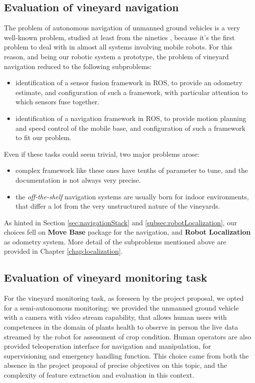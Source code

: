 \subsection{Evaluation of vineyard navigation}
The problem of autonomous navigation of unmanned ground vehicles is a very well-known problem, studied at least from the nineties \parencite{storiaUGV}, because it's the first problem to deal with in almost all systems involving mobile robots. For this reason, and being our robotic system a prototype, the problem of vineyard navigation reduced to the following subproblems:
\begin{itemize}
	\item identification of a sensor fusion framework in \ac{ROS}, to provide an odometry estimate, and configuration of such a framework, with particular attention to which sensors fuse together.
	\item identification of a navigation framework in \ac{ROS}, to provide motion planning and speed control of the mobile base, and configuration of such a framework to fit our problem.
\end{itemize}
Even if these tasks could seem trivial, two major problems arose:
\begin{itemize}
	\item complex framework like these ones have tenths of parameter to tune, and the documentation is not always very precise.
	\item the \textit{off-the-shelf} navigation systems are usually born for indoor environments, that differ a lot from the very unstructured nature of the vineyards.
\end{itemize}

As hinted in Section \ref{sec:navigationStack} and \ref{subsec:robotLocalization}, our choices fell on \textbf{Move Base} package for the navigation, and \textbf{Robot Localization} as odometry system. More detail of the subproblems mentioned above are provided in Chapter \ref{chap:localization}.

\subsection{Evaluation of vineyard monitoring task}
For the vineyard monitoring task, as foreseen by the project proposal, we opted for a semi-autonomous monitoring: we provided the unmanned ground vehicle with a camera with video stream capability, that allows human users with competences in the domain of plants health to observe in person the live data streamed by the robot for assessment of crop condition. Human operators are also provided teleoperation interface for navigation and manipulation, for supervisioning and emergency handling function. This choice came from both the absence in the project proposal of precise objectives on this topic, and the complexity of feature extraction and evaluation in this context.

